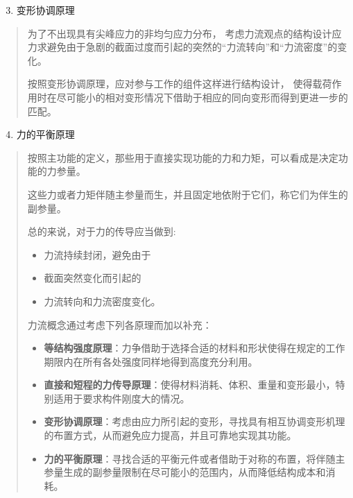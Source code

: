 \documentclass[letterpaper,10pt,english]{sphinxmanual}
\begin{document}
\begin{enumerate}
\setcounter{enumi}{2}
\item {} 
变形协调原理

\end{enumerate}
\begin{quote}

为了不出现具有尖峰应力的非均匀应力分布，
考虑力流观点的结构设计应力求避免由于急剧的截面过度而引起的突然的“力流转向”和“力流密度”的变化。

按照变形协调原理，应对参与工作的组件这样进行结构设计，
使得载荷作用时在尽可能小的相对变形情况下借助于相应的同向变形而得到更进一步的匹配。
\end{quote}
\begin{enumerate}
\setcounter{enumi}{3}
\item {} 
力的平衡原理

\end{enumerate}
\begin{quote}

按照主功能的定义，那些用于直接实现功能的力和力矩，可以看成是决定功能的力参量。

这些力或者力矩伴随主参量而生，并且固定地依附于它们，称它们为伴生的副参量。

总的来说，对于力的传导应当做到:
\begin{itemize}
\item {} 
力流持续封闭，避免由于

\item {} 
截面突然变化而引起的

\item {} 
力流转向和力流密度变化。

\end{itemize}

力流概念通过考虑下列各原理而加以补充：
\begin{itemize}
\item {} 
\textbf{等结构强度原理}：力争借助于选择合适的材料和形状使得在规定的工作期限内在所有各处强度同样地得到高度充分利用。

\item {} 
\textbf{直接和短程的力传导原理}：使得材料消耗、体积、重量和变形最小，特别适用于要求构件刚度大的情况。

\item {} 
\textbf{变形协调原理}：考虑由应力所引起的变形，寻找具有相互协调变形机理的布置方式，从而避免应力提高，并且可靠地实现其功能。

\item {} 
\textbf{力的平衡原理}：寻找合适的平衡元件或者借助于对称的布置，将伴随主参量生成的副参量限制在尽可能小的范围内，从而降低结构成本和消耗。

\end{itemize}
\end{quote}
\end{document}
